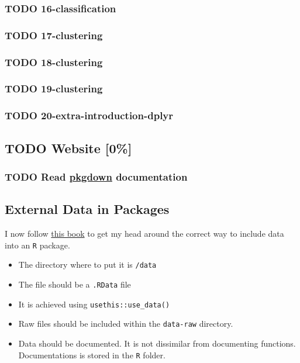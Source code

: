 \documentclass[11pt]{article}
\begin{document}
\subsubsection{{\bfseries\sffamily TODO} 16-classification}
\label{sec:org13431f1}
\subsubsection{{\bfseries\sffamily TODO} 17-clustering}
\label{sec:org69e1cc0}
\subsubsection{{\bfseries\sffamily TODO} 18-clustering}
\label{sec:org96a45a8}
\subsubsection{{\bfseries\sffamily TODO} 19-clustering}
\label{sec:org9906da2}
\subsubsection{{\bfseries\sffamily TODO} 20-extra-introduction-dplyr}
\label{sec:orga0ab39c}
\subsection{{\bfseries\sffamily TODO} Website [0\%]}
\label{sec:org39cf8b6}
\subsubsection{{\bfseries\sffamily TODO} Read \href{https://pkgdown.r-lib.org/}{pkgdown} documentation}
\label{sec:org80e55e2}
\subsection{External Data in Packages}
\label{sec:org7002848}
I now follow \href{https://r-pkgs.org/data.html}{this book} to get my head around the correct way to include data into an \texttt{R} package.
\begin{itemize}
\item The directory where to put it is \texttt{/data}
\item The file should be a \texttt{.RData} file
\item It is achieved using \texttt{usethis::use\_data()}
\item Raw files should be included within the \texttt{data-raw} directory.
\item Data should be documented. It is not dissimilar from documenting
functions. Documentations is stored in the \texttt{R} folder.
\end{itemize}
\end{document}
